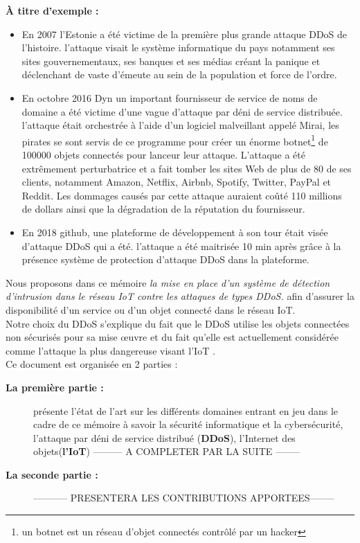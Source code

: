 \documentclass[a4paper,12pt]{report}
\begin{document}
\textbf{À titre d'exemple : } \begin{itemize}
\item En 2007 l'Estonie \cite{refestonie} a été victime de la première plus grande attaque DDoS de l'histoire. l'attaque visait le système informatique du pays notamment ses sites gouvernementaux, ses banques et ses médias créant la panique et déclenchant de vaste d'émeute au sein de la population et force de l'ordre. 
\item En octobre 2016 \cite{refddos} Dyn un important fournisseur de service de noms de domaine a été victime d'une vague d'attaque par déni de service distribuée. l'attaque était orchestrée à l'aide d'un logiciel malveillant appelé Mirai, les pirates se sont servis de ce programme pour créer un énorme botnet\footnote{ un botnet est un réseau d'objet connectés contrôlé par un hacker } de 100000 objets connectés pour lanceur leur attaque. L'attaque a été extrêmement perturbatrice et a fait tomber les sites Web de plus de 80 de ses clients, notamment Amazon, Netflix, Airbnb, Spotify, Twitter, PayPal et Reddit. Les dommages causés par cette attaque auraient coûté 110 millions de dollars ainsi que la dégradation de la réputation du fournisseur.
\item En 2018 github, une plateforme de développement à son tour était visée d'attaque DDoS qui a été. l'attaque a été maitrisée 10 min après \cite{refddos} grâce à la présence système de protection d'attaque DDoS dans la plateforme.  
\end{itemize}
Nous proposons dans ce mémoire \textit{la mise en place d'un système de détection d'intrusion dans le réseau IoT contre les attaques de types DDoS.} afin d'assurer la disponibilité d'un service ou d'un objet connecté dans le réseau IoT.\\  

Notre choix du DDoS s'explique du fait que le DDoS utilise les objets connectées non sécurisés pour sa mise œuvre et du fait qu'elle est actuellement considérée comme l'attaque la plus dangereuse visant l'IoT \cite{8355541} \cite{inproceedings}.\\

Ce document est organisée en 2 parties :

\begin{description}
\item[\textbf{La première partie :}] présente l'état de l'art sur les différents domaines entrant en jeu dans le cadre de ce mémoire à savoir la sécurité informatique et la cybersécurité, l'attaque par déni de service distribué (\textbf{DDoS}), l'Internet des objets(\textbf{l'IoT})  --------- A COMPLETER PAR LA SUITE --------
\item[\textbf{La seconde partie : }]----------- PRESENTERA LES CONTRIBUTIONS APPORTEES-------- 
\end{description}

\clearpage			


\end{document}
